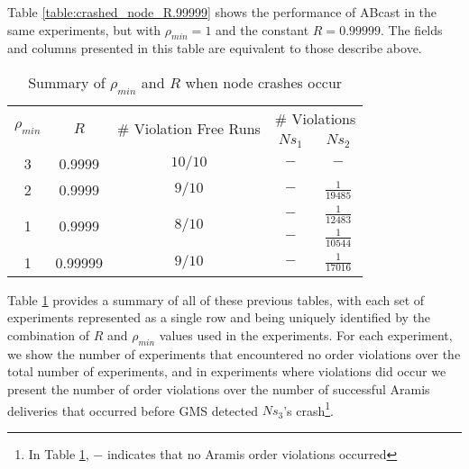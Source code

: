     Table \ref{table:crashed_node_R.99999} shows the performance of \textsf{ABcast} in the same experiments, but with $\rho_{min} = 1$ and the constant $R = 0.99999$.  The fields and columns presented in this table are equivalent to those describe above.  
    
    \begin{table}[h]
  \begin{center}
  \renewcommand{\arraystretch}{1.5}
    \begin{tabular}{|c|c|c|c|c|}
    \hline
    \multirow{2}{*}{$\rho_{min}$} & \multirow{2}{*}{$R$}    & \multirow{2}{2cm}{$\#$ Violation Free Runs} & \multicolumn{2}{|c|}{$\#$ Violations} \\ \cline{4-5}
                                 &              &                   & $Ns_1$   & $Ns_2$             \\ \hline \hline
    3                           & 0.9999  & $10/10$    & $-$        & $-$                 \\ \hline
    2                           & 0.9999  & $9/10$      & $-$        & $\frac{1}{19485}$ \\ \hline
    \multirow{2}{*}{1} & \multirow{2}{*}{0.9999} & \multirow{2}{*}{$8/10$} & $-$ & $\frac{1}{12483}$ \\ 
                                 &              &                   & $-$        & $\frac{1}{10544}$ \\ \hline
    1                           &0.99999 & $9/10$      & $-$        & $\frac{1}{17016}$ \\ \hline
    \end{tabular}
    \caption{Summary of $\rho_{min}$ and $R$ when node crashes occur}
    \label{table:crashed_node_summary}
  \end{center}
\end{table}    
    
    Table \ref{table:crashed_node_summary} provides a summary of all of these previous tables, with each set of experiments represented as a single row and being uniquely identified by the combination of $R$ and $\rho_{min}$ values used in the experiments.  For each experiment, we show the number of experiments that encountered no order violations over the total number of experiments, and in experiments where violations did occur we present the number of order violations over the number of successful \textsf{Aramis} deliveries that occurred before GMS detected $Ns_3$'s crash\footnote{In Table \ref{table:crashed_node_summary}, $-$ indicates that no \textsf{Aramis} order violations occurred}.  
     
